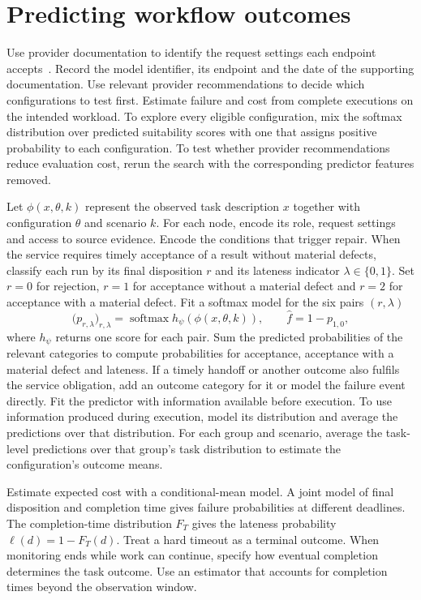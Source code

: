 \documentclass[11pt,reqno]{amsart}
\theoremstyle{definition}
\theoremstyle{remark}
\DeclareMathOperator{\softmax}{softmax}
\begin{document}
\section{Predicting workflow outcomes}
\label{sec:prediction}
Use provider documentation to identify the request settings each endpoint accepts~\cite{openai_reasoning,anthropic_effort,gemini_thinking}. Record the model identifier, its endpoint and the date of the supporting documentation.
Use relevant provider recommendations to decide which configurations to test first. Estimate failure and cost from complete executions on the intended workload.
To explore every eligible configuration, mix the softmax distribution over predicted suitability scores with one that assigns positive probability to each configuration.
To test whether provider recommendations reduce evaluation cost, rerun the search with the corresponding predictor features removed.

Let $\phi(x,\theta,k)$ represent the observed task description $x$ together with configuration $\theta$ and scenario $k$. For each node, encode its role, request settings and access to source evidence. Encode the conditions that trigger repair.
When the service requires timely acceptance of a result without material defects, classify each run by its final disposition $r$ and its lateness indicator $\lambda\in\{0,1\}$. Set $r=0$ for rejection, $r=1$ for acceptance without a material defect and $r=2$ for acceptance with a material defect. Fit a softmax model for the six pairs $(r,\lambda)$
\begin{equation}
\bigl(p_{r,\lambda}\bigr)_{r,\lambda}=\softmax h_\psi(\phi(x,\theta,k)),
\qquad \widehat f=1-p_{1,0},
\label{eq:predictor}
\end{equation}
where $h_\psi$ returns one score for each pair. Sum the predicted probabilities of the relevant categories to compute probabilities for acceptance, acceptance with a material defect and lateness. If a timely handoff or another outcome also fulfils the service obligation, add an outcome category for it or model the failure event directly.
Fit the predictor with information available before execution. To use information produced during execution, model its distribution and average the predictions over that distribution.
For each group and scenario, average the task-level predictions over that group's task distribution to estimate the configuration's outcome means.

Estimate expected cost with a conditional-mean model.
A joint model of final disposition and completion time gives failure probabilities at different deadlines. The completion-time distribution $F_T$ gives the lateness probability $\ell(d)=1-F_T(d)$.
Treat a hard timeout as a terminal outcome. When monitoring ends while work can continue, specify how eventual completion determines the task outcome. Use an estimator that accounts for completion times beyond the observation window.
\end{document}
